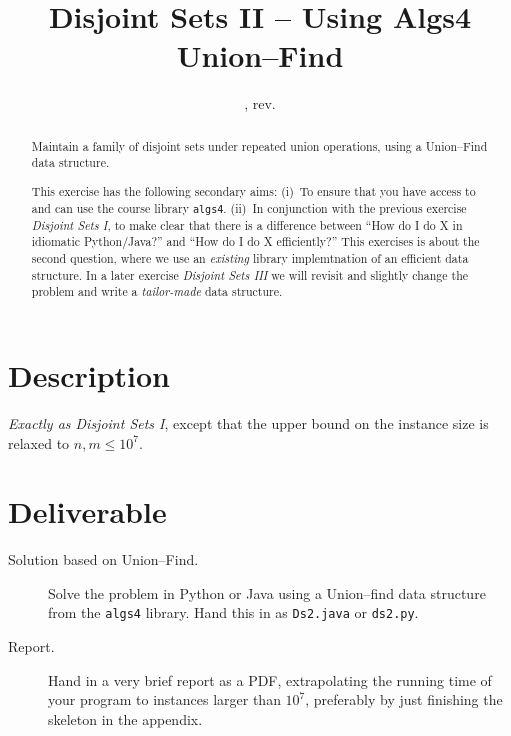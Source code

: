 \documentclass{tufte-handout}
\title{Disjoint Sets II -- Using Algs4 Union--Find}
\author{}
\date{\GITAuthorDate, rev. \GITAbrHash}
\begin{document}
\maketitle

\begin{abstract}
  Maintain a family of disjoint sets under repeated union operations, using a Union--Find data structure.

  This exercise has the following secondary aims:
  (i)~To ensure that you have access to and can use the course library \texttt{algs4}.
  (ii)~In conjunction with the previous exercise \emph{Disjoint Sets I}, to make clear that there is a difference between ``How do I do X in idiomatic Python/Java?'' and ``How do I do X efficiently?''
  This exercises is about the second question, where we use an \emph{existing} library implemtnation of an efficient data structure.
  In a later exercise \emph{Disjoint Sets III} we will revisit and slightly change the problem and write a \emph{tailor-made} data structure.
\end{abstract}

\section{Description}

\emph{Exactly as Disjoint Sets I}, except that the upper bound on the instance size is relaxed to $n,m\leq 10^7$.

\section{Deliverable}

\begin{description}
  \item[Solution based on Union--Find.]
    Solve the problem in Python or Java using a Union--find data structure from the \texttt{algs4} library.
    Hand this in as \texttt{Ds2.java} or \texttt{ds2.py}.
  \item[Report.]
    Hand in a very brief report as a PDF, extrapolating the running time of your program to instances larger than $10^7$, preferably by just finishing the skeleton in the appendix. 
\end{description}
\end{document}
